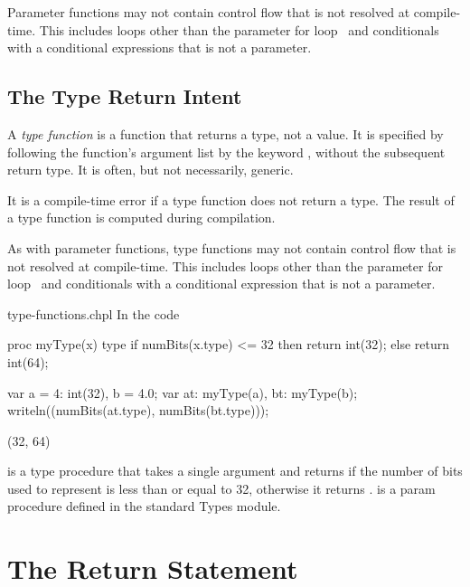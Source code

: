 Parameter functions may not contain control flow that is not resolved
at compile-time.  This includes loops other than the parameter for
loop~ and conditionals with a conditional
expressions that is not a parameter.


\subsection{The Type Return Intent}
\label{Type_Return_Intent}

A \emph{type function} is a function that returns a type, not a value.  It is
specified by following the function's argument list by the keyword ,
without the subsequent return type.  It is often, but not necessarily, generic.

It is a compile-time error if a type function does not return a type.
The result of a type function is computed during compilation.

As with parameter functions, type functions may not contain control
flow that is not resolved at compile-time.  This includes loops other
than the parameter for loop~ and
conditionals with a conditional expression that is not a parameter.

\begin{chapelexample}{type-functions.chpl}
In the code
\begin{chapel}
proc myType(x) type {
  if numBits(x.type) <= 32 then return int(32);
  else return int(64);
}
\end{chapel}
\begin{chapelpost}
var a = 4: int(32),
    b = 4.0;
var at: myType(a),
    bt: myType(b);
writeln((numBits(at.type), numBits(bt.type)));
\end{chapelpost}
\begin{chapeloutput}
(32, 64)
\end{chapeloutput}
 is a type procedure that takes a single
argument  and returns  if the number of bits used to
represent  is less than or equal to 32, otherwise it
returns .   is a param
procedure defined in the standard Types module.
\end{chapelexample}


\section{The Return Statement}
\label{The_Return_Statement}


